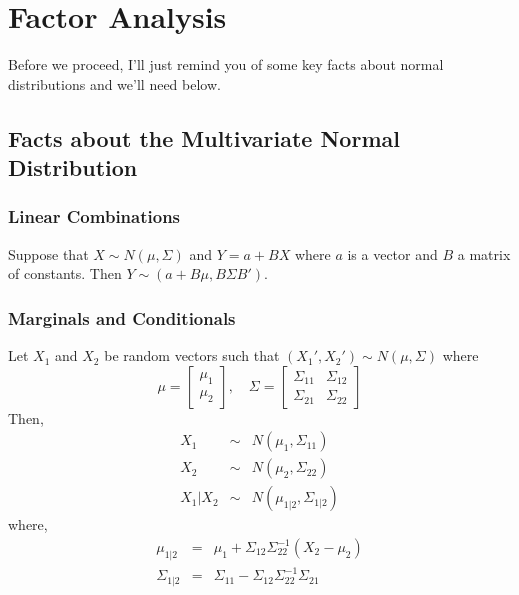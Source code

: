 \documentclass[12pt]{article}
\theoremstyle{definition}
\begin{document}
\section{Factor Analysis}

Before we proceed, I'll just remind you of some key facts about normal distributions and we'll need below.

\subsection{Facts about the Multivariate Normal Distribution}
\subsubsection{Linear Combinations}
Suppose that $X \sim N(\mu, \Sigma)$ and $Y = a + BX$ where $a$ is a vector and $B$ a matrix of constants. Then $Y \sim (a + B\mu, B\Sigma B')$.
\subsubsection{Marginals and Conditionals}
Let $X_1$ and $X_2$ be random vectors such that $(X_1' , X_2') \sim N(\mu, \Sigma)$ where
	$$\mu = \left[\begin{array}{c}
		\mu_1 \\ \mu_2
	\end{array}\right], \quad \Sigma = \left[ \begin{array}{cc}
	\Sigma_{11} & \Sigma_{12}\\
	\Sigma_{21} & \Sigma_{22}
	\end{array}\right]
	$$
Then, 
	\begin{eqnarray*}
		X_1 &\sim& N(\mu_1, \Sigma_{11})\\
		X_2 &\sim& N(\mu_2, \Sigma_{22})\\
		X_1|X_2 &\sim& N(\mu_{1|2}, \Sigma_{1|2})
	\end{eqnarray*}
where,
	\begin{eqnarray*}
		\mu_{1|2} &=& \mu_1 + \Sigma_{12}\Sigma_{22}^{-1}(X_2 - \mu_2)\\
		\Sigma_{1|2} &=&\Sigma_{11} - \Sigma_{12} \Sigma_{22}^{-1} \Sigma_{21}
	\end{eqnarray*}
\end{document}
